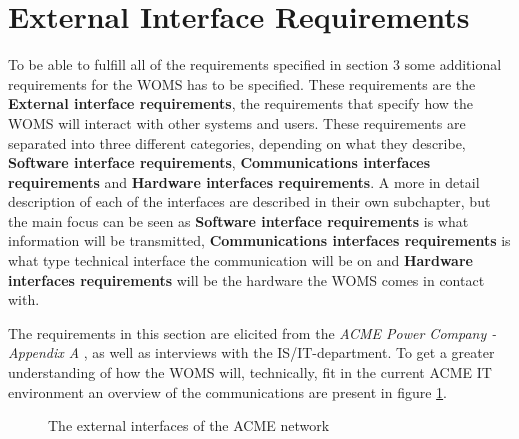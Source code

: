 \section{External Interface Requirements}
\label{sec:external_interface_requirements}

To be able to fulfill all of the requirements specified in section 3 some additional requirements for the WOMS has to be specified. These requirements are the \textbf{External interface requirements}, the requirements that specify how the WOMS will interact with other systems and users.  These requirements are separated into three different categories, depending on what they describe, \textbf{Software interface requirements}, \textbf{Communications interfaces requirements} and \textbf{Hardware interfaces requirements}. A more in detail description of each of the interfaces are described in their own subchapter, but the main focus can be seen as \textbf{Software interface requirements} is what information will be transmitted, \textbf{Communications interfaces requirements} is what type technical interface the communication will be on and \textbf{Hardware interfaces requirements} will be the hardware the WOMS comes in contact with. 

The requirements in this section are elicited from the \emph{ACME Power Company - Appendix A} \cite{A}, as well as interviews with the IS/IT-department. To get a greater understanding of how the WOMS will, technically, fit in the current ACME IT environment an overview of the communications are present in figure \ref{fig:external_interfaces}.


\begin{figure}[H]
	\centering
	\setlength\fboxsep{7pt}
	\setlength\fboxrule{0.5pt}
	\caption{The external interfaces of the ACME network}
	\label{fig:external_interfaces}                      	
\end{figure}

